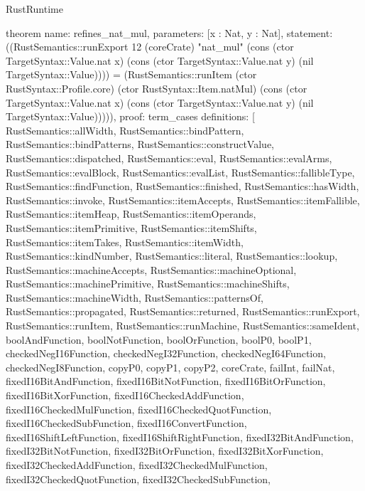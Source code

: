 \begin{lexlean}{RustRuntime}
\begin{semanticmodule}
theorem{
  name: refines_nat_mul,
  parameters: [x : Nat, y : Nat],
  statement: ((RustSemantics::runExport 12 (coreCrate) "nat_mul" (cons (ctor TargetSyntax::Value.nat x) (cons (ctor TargetSyntax::Value.nat y) (nil TargetSyntax::Value)))) = (RustSemantics::runItem (ctor RustSyntax::Profile.core) (ctor RustSyntax::Item.natMul) (cons (ctor TargetSyntax::Value.nat x) (cons (ctor TargetSyntax::Value.nat y) (nil TargetSyntax::Value))))),
  proof: term_cases{
    definitions: [
      RustSemantics::allWidth,
      RustSemantics::bindPattern,
      RustSemantics::bindPatterns,
      RustSemantics::constructValue,
      RustSemantics::dispatched,
      RustSemantics::eval,
      RustSemantics::evalArms,
      RustSemantics::evalBlock,
      RustSemantics::evalList,
      RustSemantics::fallibleType,
      RustSemantics::findFunction,
      RustSemantics::finished,
      RustSemantics::hasWidth,
      RustSemantics::invoke,
      RustSemantics::itemAccepts,
      RustSemantics::itemFallible,
      RustSemantics::itemHeap,
      RustSemantics::itemOperands,
      RustSemantics::itemPrimitive,
      RustSemantics::itemShifts,
      RustSemantics::itemTakes,
      RustSemantics::itemWidth,
      RustSemantics::kindNumber,
      RustSemantics::literal,
      RustSemantics::lookup,
      RustSemantics::machineAccepts,
      RustSemantics::machineOptional,
      RustSemantics::machinePrimitive,
      RustSemantics::machineShifts,
      RustSemantics::machineWidth,
      RustSemantics::patternsOf,
      RustSemantics::propagated,
      RustSemantics::returned,
      RustSemantics::runExport,
      RustSemantics::runItem,
      RustSemantics::runMachine,
      RustSemantics::sameIdent,
      boolAndFunction,
      boolNotFunction,
      boolOrFunction,
      boolP0,
      boolP1,
      checkedNegI16Function,
      checkedNegI32Function,
      checkedNegI64Function,
      checkedNegI8Function,
      copyP0,
      copyP1,
      copyP2,
      coreCrate,
      failInt,
      failNat,
      fixedI16BitAndFunction,
      fixedI16BitNotFunction,
      fixedI16BitOrFunction,
      fixedI16BitXorFunction,
      fixedI16CheckedAddFunction,
      fixedI16CheckedMulFunction,
      fixedI16CheckedQuotFunction,
      fixedI16CheckedSubFunction,
      fixedI16ConvertFunction,
      fixedI16ShiftLeftFunction,
      fixedI16ShiftRightFunction,
      fixedI32BitAndFunction,
      fixedI32BitNotFunction,
      fixedI32BitOrFunction,
      fixedI32BitXorFunction,
      fixedI32CheckedAddFunction,
      fixedI32CheckedMulFunction,
      fixedI32CheckedQuotFunction,
      fixedI32CheckedSubFunction,
}}
\end{semanticmodule}
\end{lexlean}
